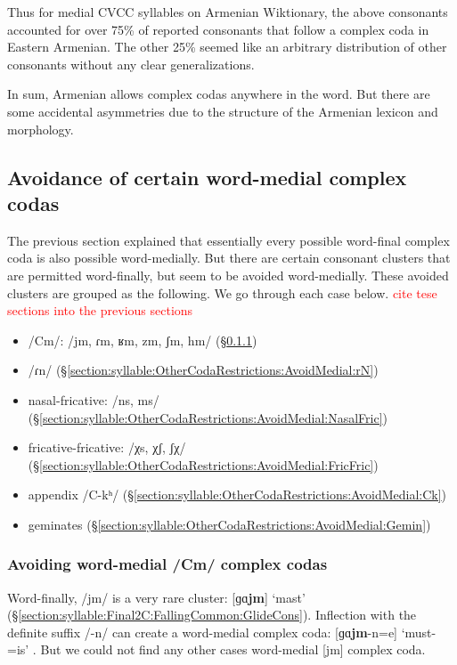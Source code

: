 	Thus for medial CVCC syllables   on Armenian Wiktionary, the above consonants accounted for over 75\% of reported consonants that follow a complex coda in Eastern Armenian. The other 25\% seemed like an arbitrary distribution of other consonants without any clear generalizations. 
	
	In sum, Armenian allows complex codas anywhere in the word. But there are some accidental asymmetries due to the structure of the Armenian lexicon and morphology. 
	
	\subsection{Avoidance of certain word-medial  complex codas}\label{section:syllable:OtherCodaRestrictions:AvoidMedial}
	The previous section explained that essentially every possible word-final complex coda is also possible word-medially. But there are certain consonant clusters that are permitted word-finally, but seem to be avoided word-medially. These avoided clusters are  grouped as the following. We go through each case below. 
	\textcolor{red}{cite tese sections into the previous sections}
	\begin{itemize}[noitemsep, topsep=0pt]
		\item /Cm/:  /jm, ɾm, ʁm, zm, ʃm, hm/ (\S\ref{section:syllable:OtherCodaRestrictions:AvoidMedial:Cm})
		\item /ɾn/  (\S\ref{section:syllable:OtherCodaRestrictions:AvoidMedial:rN})
		\item nasal-fricative: /ns, ms/  (\S\ref{section:syllable:OtherCodaRestrictions:AvoidMedial:NasalFric})
		\item fricative-fricative:   /χs, χʃ, ʃχ/ (\S\ref{section:syllable:OtherCodaRestrictions:AvoidMedial:FricFric})
		\item appendix /C-kʰ/ (\S\ref{section:syllable:OtherCodaRestrictions:AvoidMedial:Ck})
		\item geminates (\S\ref{section:syllable:OtherCodaRestrictions:AvoidMedial:Gemin})
	\end{itemize}
	
	
	\subsubsection{Avoiding word-medial /Cm/ complex codas}\label{section:syllable:OtherCodaRestrictions:AvoidMedial:Cm}
	Word-finally, /jm/ is a very rare cluster: [ɡɑ\textbf{jm}] `mast' (\S\ref{section:syllable:Final2C:FallingCommon:GlideCons}). Inflection with the definite suffix /-n/ can create a word-medial complex coda: [ɡɑ\textbf{jm}-n=e] `must-{}=is' . But we could not find any other cases word-medial [jm] complex coda. 
	
